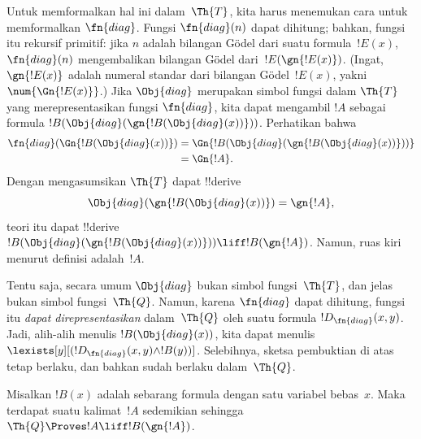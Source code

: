 \documentclass[../../../include/open-logic-section]{subfiles}
\begin{document}
\begin{explain}
Untuk memformalkan hal ini dalam~$\Th{T}$, kita harus menemukan cara untuk
memformalkan $\fn{diag}$. Fungsi $\fn{diag}(n)$ dapat dihitung; bahkan,
fungsi itu rekursif primitif: jika $n$ adalah bilangan G\"odel dari suatu
formula~$!E(x)$, $\fn{diag}(n)$ mengembalikan bilangan G\"odel
dari~$!E(\gn{!E(x)})$. (Ingat, $\gn{!E(x)}$ adalah numeral standar dari
bilangan G\"odel~$!E(x)$, yakni $\num{\Gn{!E(x)}}$.) Jika $\Obj{diag}$
merupakan simbol fungsi dalam $\Th{T}$ yang merepresentasikan fungsi
$\fn{diag}$, kita dapat mengambil $!A$ sebagai formula
$!B(\Obj{diag}(\gn{!B(\Obj{diag}(x))}))$. Perhatikan bahwa
\begin{align*}
\fn{diag}(\Gn{!B(\Obj{diag}(x))}) & =
\Gn{!B(\Obj{diag}(\gn{!B(\Obj{diag}(x))}))} \\
& = \Gn{!A}.
\end{align*}
Dengan mengasumsikan $\Th{T}$ dapat !!{derive}
\[
\Obj{diag}(\gn{!B(\Obj{diag}(x))}) = \gn{!A},
\]
teori itu dapat !!{derive} $!B(\Obj{diag}(\gn{!B(\Obj{diag}(x))}))
\liff !B(\gn{!A})$. Namun, ruas kiri menurut definisi adalah~$!A$.

Tentu saja, secara umum $\Obj{diag}$ bukan simbol fungsi~$\Th{T}$, dan jelas
bukan simbol fungsi~$\Th{Q}$. Namun, karena $\fn{diag}$ dapat dihitung,
fungsi itu \emph{dapat direpresentasikan} dalam~$\Th{Q}$ oleh suatu formula
$!D_{\fn{diag}}(x,y)$. Jadi, alih-alih menulis $!B(\Obj{diag}(x))$, kita
dapat menulis $\lexists[y][(!D_{\fn{diag}}(x,y) \land !B(y))]$. Selebihnya,
sketsa pembuktian di atas tetap berlaku, dan bahkan sudah berlaku
dalam~$\Th{Q}$.
\end{explain}

\begin{lem}
 Misalkan $!B(x)$ adalah sebarang formula dengan satu
variabel bebas~$x$. Maka terdapat suatu kalimat~$!A$ sedemikian sehingga
$\Th{Q} \Proves !A \liff !B(\gn{!A})$.
\end{lem}
\end{document}
